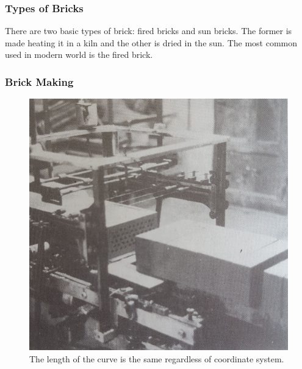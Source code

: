 \subsubsection{Types of Bricks}

There are two basic types of brick: fired bricks and sun bricks. The former is made heating it in a kiln and the other is dried in the sun. The most common used in modern world is the fired brick. 

\subsubsection{Brick Making}

\begin{figure}[H]
\centering
\includegraphics[width=0.9\linewidth ]{figure/Theory/wireBrick.jpg}
\caption{The length of the curve is the same regardless of coordinate system.}
\end{figure}

